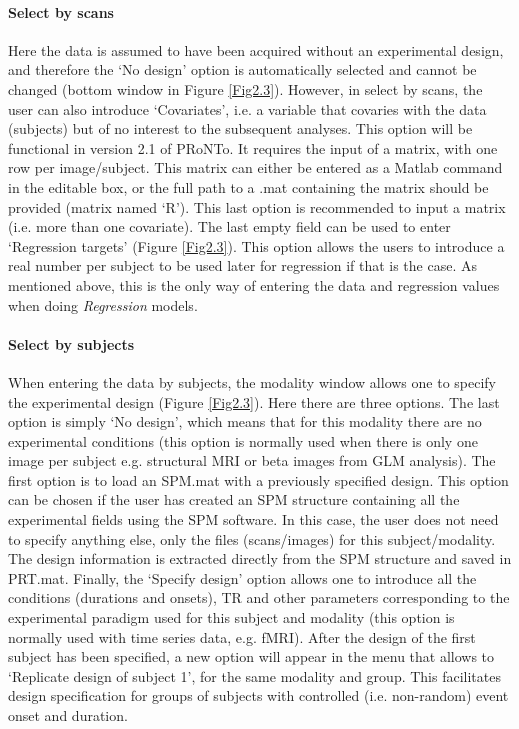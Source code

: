 \paragraph{Select by scans} Here the data is assumed to have been acquired without an experimental design, and therefore the `No design' option is automatically selected and cannot be changed (bottom window in Figure \ref{Fig2.3}). However, in select by scans, the user can also introduce `Covariates', i.e. a variable that covaries with the data (subjects) but of no interest to the subsequent analyses. This option will be functional in version 2.1 of PRoNTo. It requires the input of a matrix, with one row per image/subject. This matrix can either be entered as a Matlab command in the editable box, or the full path to a .mat containing the matrix should be provided (matrix named  `R'). This last option is recommended to input a matrix (i.e. more than one covariate). The last empty field can be used to enter `Regression targets'  (Figure \ref{Fig2.3}). This option allows the users to introduce a real number per subject to be used later for regression if that is the case. 
As mentioned above, this is the only way of entering the data and regression values when doing
\textit{Regression} models.
\paragraph{Select by subjects} When entering the data by subjects, the modality window allows one to specify the experimental design (Figure \ref{Fig2.3}). Here there are three options. The last option is simply `No design', which means that for this modality there are no experimental conditions (this option is normally used when there is only one image per subject e.g. structural MRI or beta images from GLM analysis). The first option is to load an SPM.mat with a previously specified design. This option can be chosen if the user has created an SPM structure containing all the experimental fields using the SPM software. In this case, the user does not need to specify anything else, only the files (scans/images) for this subject/modality. The design information is extracted directly from the SPM structure and saved in PRT.mat. Finally, the `Specify design' option allows one to introduce all the conditions (durations and onsets), TR and other parameters corresponding to the experimental paradigm used for this subject and modality (this option is normally used with time series data, e.g. fMRI). After the design of the first subject has been specified, a new option will appear in the menu that allows to `Replicate design of subject 1', for the same modality and group. This facilitates design specification for groups of subjects with controlled (i.e. non-random) event onset and duration.


